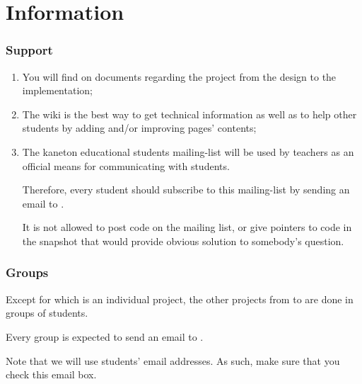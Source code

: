%
%

\section{Information}


\begin{frame}
  \frametitle{Support}

  \begin{enumerate}
    \item

      \-

      You will find on  documents regarding
      the project from the design to the implementation;
    \item

      \-

      The wiki  is the best way to get
      technical information as well as to help other students by adding
      and/or improving pages' contents;
    \item

      \-

      The kaneton educational students mailing-list
       will be used by teachers as
      an official means for communicating with students.

      \-

      Therefore, every student should subscribe to this mailing-list by sending
      an email to .

      \-

      It is not allowed to post code on the mailing list, or give pointers to
      code in the snapshot that would provide obvious solution to somebody's
      question.
  \end{enumerate}
\end{frame}


\begin{frame}
  \frametitle{Groups}

  Except for  which is an individual project, the other projects
  from  to  are done in groups of  students.

  \-

  Every group is expected to send an email to
  .

  \-

  Note that we will use students'  email addresses. As such,
  make sure that you check this email box.
\end{frame}

